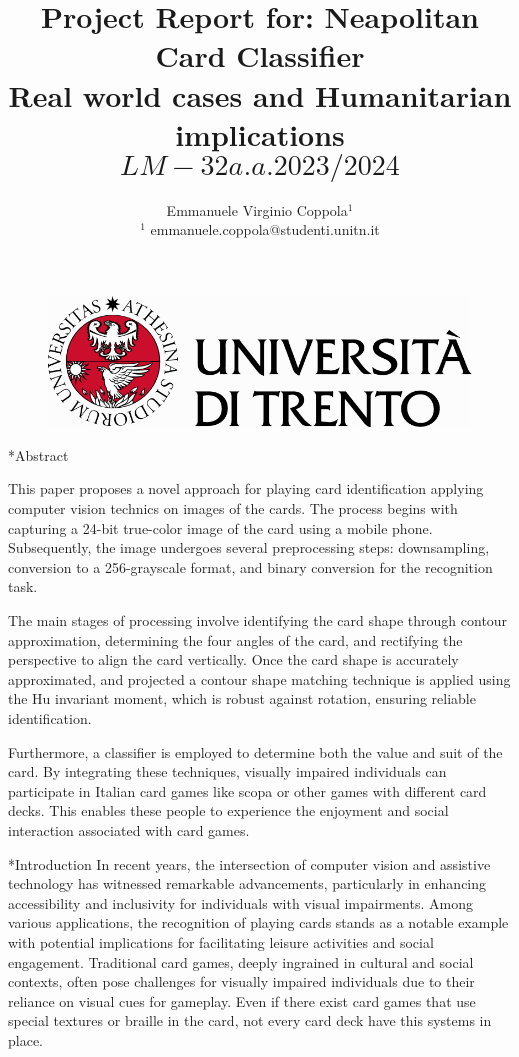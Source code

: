 \documentclass[twocolumn, a4paper,10pt]{article}
\title{%
Project Report for: Neapolitan Card Classifier\\																								%
\vspace{4pt}
Real world cases and Humanitarian implications \[LM-32 a.a. 2023/2024\]
} 																																%
\author{																																														%
Emmanuele Virginio Coppola$^1$\\ 																										%
$^1$ emmanuele.coppola@studenti.unitn.it\\ 																																	%
\phantom{Line 9}} 																																									%
\date{\vspace{-0.5cm}}	%
\makeatletter
\renewcommand\section{\@startsection{section}{1}{\z@}{3pt}{3pt}{\normalfont\large\bfseries}}
\makeatother
\begin{document}
\maketitle
\begin{figure}
  \centering

\includegraphics[scale=0.6]{img/Logo.pdf}
\end{figure}
\section*{Abstract}	%
\addtocounter{section}{1}

This paper proposes a novel approach for playing card identification applying computer vision technics on images of the cards. The process begins with capturing a 24-bit true-color image of the card using a mobile phone. Subsequently, the image undergoes several preprocessing steps: downsampling, conversion to a 256-grayscale format, and binary conversion for the recognition task.

The main stages of processing involve identifying the card shape through contour approximation, determining the four angles of the card, and rectifying the perspective to align the card vertically. Once the card shape is accurately approximated, and projected a contour shape matching technique is applied using the Hu invariant moment, which is robust against rotation, ensuring reliable identification.

Furthermore, a classifier is employed to determine both the value and suit of the card. By integrating these techniques, visually impaired individuals can participate in Italian card games like scopa or other games with different card decks. This enables these people to experience the enjoyment and social interaction associated with card games.

\section*{Introduction}
In recent years, the intersection of computer vision and assistive technology has witnessed remarkable advancements, particularly in enhancing accessibility and inclusivity for individuals with visual impairments. Among various applications, the recognition of playing cards stands as a notable example with potential implications for facilitating leisure activities and social engagement. Traditional card games, deeply ingrained in cultural and social contexts, often pose challenges for visually impaired individuals due to their reliance on visual cues for gameplay. Even if there exist card games that use special textures or braille in the card, not every card deck have this systems in place.
\end{document}
